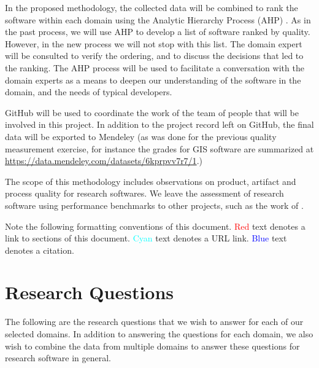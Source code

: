 \documentclass[letterpaper,cleveref]{lipics-v2019}
\theoremstyle{definition}
\begin{document}
In the proposed methodology, the collected data will be combined to rank the
software within each domain using the Analytic Hierarchy Process (AHP)
\citep{Saaty1980}.  As in the past process, we will use AHP to develop a list of software
ranked by quality.  However, in the new process we will not stop with this
list.  The domain expert will be consulted to verify the ordering, and to
discuss the decisions that led to the ranking.  The AHP process will be used to
facilitate a conversation with the domain experts as a means to deepen our
understanding of the software in the domain, and the needs of typical developers.

GitHub will be used to coordinate the work of the team of people that will
be involved in this project.  In addition to the project record left on GitHub,
the final data will be exported to Mendeley (as was done for the previous
quality measurement exercise, for instance the grades for GIS software are
summarized at \href{https://data.mendeley.com/datasets/6kprpvv7r7/1}
{https://data.mendeley.com/datasets/6kprpvv7r7/1}.)

The scope of this methodology includes observations on product, artifact and
process quality for research softwares. We leave the assessment of research
software using performance benchmarks to other projects, such as the work of
\cite{kaagstrom1998gemm}. 
 
Note the following formatting conventions of this document. \textcolor{red}{Red}
text denotes a link to sections of this document. \textcolor{cyan}{Cyan}
text denotes a URL link. \textcolor{blue}{Blue} text denotes a citation.

\section{Research Questions} \label{ResearchQuestions}

The following are the research questions that we wish to answer for each of our
selected domains.  In addition to answering the questions for each domain, we
also wish to combine the data from multiple domains to answer these questions
for research software in general.
\end{document}
